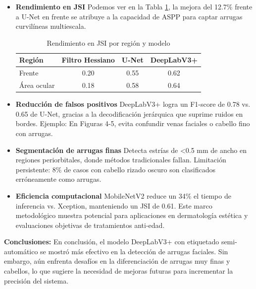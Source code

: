 \begin{itemize}
    \item \textbf{Rendimiento en JSI}
	Podemos ver en la Tabla \ref{tab:jsi_performance}, la mejora del 12.7\% frente a U-Net en frente se atribuye a la capacidad de ASPP para captar arrugas curvilíneas multiescala.
	
	\begin{table}[H]
		\centering
		\caption{Rendimiento en JSI por región y modelo}
		\renewcommand{\arraystretch}{1.2} %
		\setlength{\tabcolsep}{5pt} %
		\begin{tabularx}{\textwidth}{@{}X c c c@{}}
			\toprule
			\textbf{Región} & \textbf{Filtro Hessiano} & \textbf{U-Net} & \textbf{DeepLabV3+} \\
			\midrule
			Frente & 0.20 & 0.55 & 0.62 \\
			Área ocular & 0.18 & 0.58 & 0.64 \\
			\bottomrule
		\end{tabularx}
		\label{tab:jsi_performance}
	\end{table}


	\item \textbf{Reducción de falsos positivos}
	DeepLabV3+ logra un F1-score de 0.78 vs. 0.65 de U-Net, gracias a la decodificación jerárquica que suprime ruidos en bordes.
	Ejemplo: En Figuras 4-5, evita confundir venas faciales o cabello fino con arrugas.
	
	\item \textbf{Segmentación de arrugas finas}
	Detecta estrías de <0.5 mm de ancho en regiones periorbitales, donde métodos tradicionales fallan.
	Limitación persistente: 8\% de casos con cabello rizado oscuro son clasificados erróneamente como arrugas.
	
	\item \textbf{Eficiencia computacional}
MobileNetV2 reduce un 34\% el tiempo de inferencia vs. Xception, manteniendo un JSI de 0.61.
Este marco metodológico muestra potencial para aplicaciones en dermatología estética y evaluaciones objetivas de tratamientos anti-edad.
\end{itemize}

\textbf{Conclusiones:}
En conclusión, el modelo DeepLabV3+ con etiquetado semi-automático se mostró más efectivo en la detección de arrugas faciales. Sin embargo, aún enfrenta desafíos en la diferenciación de arrugas muy finas y cabellos, lo que sugiere la necesidad de mejoras futuras para incrementar la precisión del sistema.


